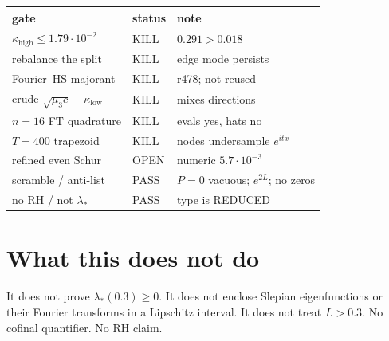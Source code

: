 \documentclass[11pt]{article}
\theoremstyle{remark}
\begin{document}
\begin{center}
\small
\begin{tabular}{@{}lll@{}}
\toprule
gate & status & note\\
\midrule
$\kappa_{\mathrm{high}}\le1.79\cdot10^{-2}$ & KILL & $0.291>0.018$\\
rebalance the split & KILL & edge mode persists\\
Fourier--HS majorant & KILL & r478; not reused\\
crude $\sqrt{\mu_3 c}-\kappa_{\mathrm{low}}$ & KILL & mixes directions\\
$n=16$ FT quadrature & KILL & evals yes, hats no\\
$T=400$ trapezoid & KILL & nodes undersample $e^{itx}$\\
refined even Schur & OPEN & numeric $5.7\cdot10^{-3}$\\
scramble / anti-list & PASS & $P=0$ vacuous; $e^{2L}$; no zeros\\
no RH / not $\lambda_*$ & PASS & type is REDUCED\\
\bottomrule
\end{tabular}
\end{center}

\section{What this does not do}

It does not prove $\lambda_*(0.3)\ge0$.
It does not enclose Slepian eigenfunctions or their Fourier
transforms in a Lipschitz interval.
It does not treat $L>0.3$.
No cofinal quantifier.
No RH claim.
\end{document}
